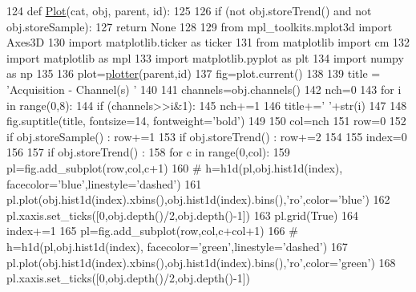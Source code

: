 \begin{DoxyCode}
124 \textcolor{keyword}{def }\hyperlink{namespaceAcquisition_a0e0ed7939299c431d7eceb1dde96fa07}{Plot}(cat, obj, parent, id):
125     
126     \textcolor{keywordflow}{if} (\textcolor{keywordflow}{not} obj.storeTrend() \textcolor{keywordflow}{and} \textcolor{keywordflow}{not} obj.storeSample):
127         \textcolor{keywordflow}{return} \textcolor{keywordtype}{None}
128     
129     \textcolor{keyword}{from} mpl\_toolkits.mplot3d \textcolor{keyword}{import} Axes3D
130     \textcolor{keyword}{import} matplotlib.ticker \textcolor{keyword}{as} ticker
131     \textcolor{keyword}{from} matplotlib \textcolor{keyword}{import} cm
132     \textcolor{keyword}{import} matplotlib \textcolor{keyword}{as} mpl
133     \textcolor{keyword}{import} matplotlib.pyplot \textcolor{keyword}{as} plt
134     \textcolor{keyword}{import} numpy \textcolor{keyword}{as} np
135 
136     plot=\hyperlink{namespaceplotter}{plotter}(parent,id)
137     fig=plot.current()
138 
139     title = \textcolor{stringliteral}{'Acquisition - Channel(s) '}
140 
141     channels=obj.channels()
142     nch=0
143     \textcolor{keywordflow}{for} i \textcolor{keywordflow}{in} range(0,8): 
144         \textcolor{keywordflow}{if} (channels>>i&1): 
145             nch+=1
146             title+=\textcolor{stringliteral}{' '}+str(i)
147 
148     fig.suptitle(title, fontsize=14, fontweight=\textcolor{stringliteral}{'bold'})
149     
150     col=nch
151     row=0
152     \textcolor{keywordflow}{if} obj.storeSample() : row+=1
153     \textcolor{keywordflow}{if} obj.storeTrend() : row+=2
154 
155     index=0
156 
157     \textcolor{keywordflow}{if} obj.storeTrend() : 
158         \textcolor{keywordflow}{for} c \textcolor{keywordflow}{in} range(0,col):
159             pl=fig.add\_subplot(row,col,c+1)     
160 \textcolor{comment}{#            h=h1d(pl,obj.hist1d(index), facecolor='blue',linestyle='dashed')}
161             pl.plot(obj.hist1d(index).xbins(),obj.hist1d(index).bins(),\textcolor{stringliteral}{'ro'},color=\textcolor{stringliteral}{'blue'})
162             pl.xaxis.set\_ticks([0,obj.depth()/2,obj.depth()-1])
163             pl.grid(\textcolor{keyword}{True})
164             index+=1
165             pl=fig.add\_subplot(row,col,c+col+1)     
166 \textcolor{comment}{#            h=h1d(pl,obj.hist1d(index), facecolor='green',linestyle='dashed')}
167             pl.plot(obj.hist1d(index).xbins(),obj.hist1d(index).bins(),\textcolor{stringliteral}{'ro'},color=\textcolor{stringliteral}{'green'})
168             pl.xaxis.set\_ticks([0,obj.depth()/2,obj.depth()-1])

\end{DoxyCode}
